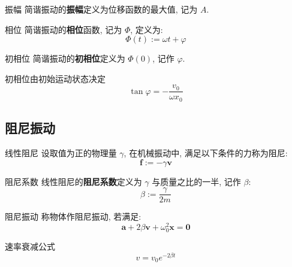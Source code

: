 \documentclass[UTF8]{ctexart}
\begin{document}
            \begin{dfn}
                {振幅}
                简谐振动的\textbf{振幅}定义为位移函数的最大值, 记为 \(A\). 
            \end{dfn}
            
            \begin{dfn}
                {相位}
                简谐振动的\textbf{相位}函数, 记为 \(\Phi\), 定义为: 
                \[\Phi(t):=\omega t+\varphi\]
            \end{dfn}
            
            \begin{dfn}
                {初相位}
                简谐振动的\textbf{初相位}定义为 \(\Phi(0)\), 记作 \(\varphi\). 
            \end{dfn}
            
            \begin{ppt}
                {初相位由初始运动状态决定}
                \[\tan\varphi=-\frac{v_0}{\omega x_0}\]
            \end{ppt}

        \subsection{阻尼振动}
            
            \begin{dfn}
                {线性阻尼}
                设取值为正的物理量 \(\gamma\), 在机械振动中, 满足以下条件的力称为阻尼: 
                \[\bm{f}:=-\gamma\bm{v}\]
            \end{dfn}
            
            \begin{dfn}
                {阻尼系数}
                线性阻尼的\textbf{阻尼系数}定义为 \(\gamma\) 与质量之比的一半, 记作 \(\beta\): 
                \[\beta:=\frac{\gamma}{2m}\]
            \end{dfn}
            
            \begin{thm}
                {阻尼振动}
                称物体作阻尼振动, 若满足: 
                \[\bm{a}+2\beta\bm{v}+\omega_0^2\bm{x}=\bm{0}\]
            \end{thm}
            
            \begin{thm}
                {速率衰减公式}
                \[v=v_0 e^{-2\beta t}\]
            \end{thm}
            
\end{document}
